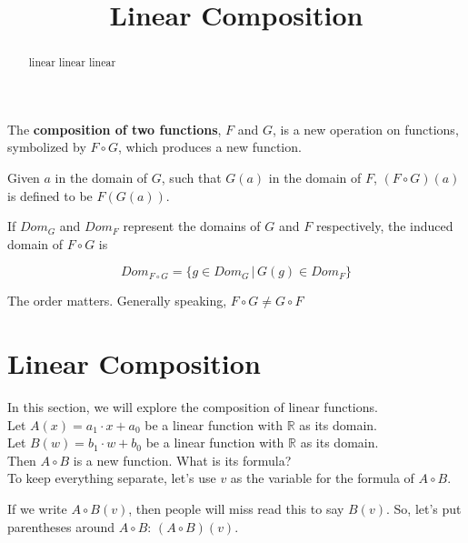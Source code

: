 \documentclass{ximera}
\title{Linear Composition}
\begin{document}
\begin{abstract}
linear linear linear
\end{abstract}
\maketitle


The \textbf{composition of two functions}, $F$ and $G$, is a new operation on functions, symbolized by $F \circ G$, which produces a new function.


\begin{definition}
Given $a$ in the domain of $G$, such that $G(a)$ in the domain of $F$, $(F \circ G)(a)$ is defined to be  $F(G(a))$.


If $Dom_G$ and $Dom_F$ represent the domains of $G$ and $F$ respectively, the induced domain of $F \circ G$ is 




\[  Dom_{F \circ G} = \{  g \in  Dom_G  \,   |   \,   G(g) \in Dom_F                 \}           \]

\end{definition}

The order matters.  Generally speaking, $F \circ G \ne G \circ F$



\section{Linear Composition}

In this section, we will explore the composition of linear functions. \\


Let $A(x) = a_1 \cdot x + a_0$ be a linear function with $\mathbb{R}$ as its domain. \\
Let $B(w) = b_1 \cdot w + b_0$ be a linear function with $\mathbb{R}$ as its domain. \\


Then $A \circ B$ is a new function. What is its formula? \\

To keep everything separate, let's use $v$ as the variable for the formula of $A \circ B$.


If we write $A \circ B(v)$, then people will miss read this to say $B(v)$.  So, let's put parentheses around $A \circ B$: $(A \circ B)(v)$.
\end{document}
